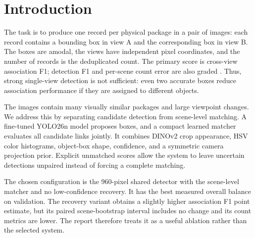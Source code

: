\section{Introduction}
The task is to produce one record per physical package in a pair of images: each record contains a bounding box in view A and the corresponding box in view B. The boxes are amodal, the views have independent pixel coordinates, and the number of records is the deduplicated count. The primary score is cross-view association F1; detection F1 and per-scene count error are also graded \cite{coursebrief}. Thus, strong single-view detection is not sufficient: even two accurate boxes reduce association performance if they are assigned to different objects.

The images contain many visually similar packages and large viewpoint changes. We address this by separating candidate detection from scene-level matching. A fine-tuned YOLO26n model proposes boxes, and a compact learned matcher evaluates all candidate links jointly. It combines DINOv2 crop appearance, HSV color histograms, object-box shape, confidence, and a symmetric camera projection prior. Explicit unmatched scores allow the system to leave uncertain detections unpaired instead of forcing a complete matching.

The chosen configuration is the 960-pixel shared detector with the scene-level matcher and no low-confidence recovery. It has the best measured overall balance on validation. The recovery variant obtains a slightly higher association F1 point estimate, but its paired scene-bootstrap interval includes no change and its count metrics are lower. The report therefore treats it as a useful ablation rather than the selected system.
